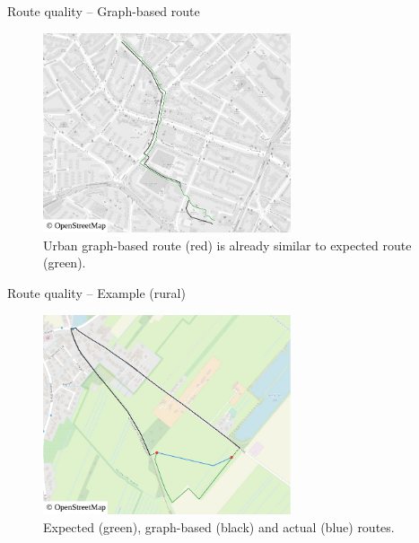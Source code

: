 \documentclass[xcolor={x11names}]{beamer}
\newenvironment{figcenter}
{%
	\parskip=0pt%
	\par%
	\nopagebreak%
	\centering%
}%
{%
	\par%
	\noindent%
	\ignorespacesafterend%
}
\begin{document}
		\begin{frame}{Route quality -- Graph-based route}
			\begin{figure}
				\begin{figcenter}
					\includegraphics[width=0.65\textwidth]{images/qgis-routing-similar.pdf}
				\end{figcenter}
				\caption{Urban graph-based route (red) is already similar to expected route (green).}
			\end{figure}
		\end{frame}
		
		\begin{frame}{Route quality -- Example (rural)}
			\begin{figure}
				\begin{figcenter}
					\includegraphics[width=0.65\textwidth]{images/qgis-routing-rural-routing-6-graph-based.pdf}
				\end{figcenter}
				\caption{Expected (green), graph-based (black) and actual (blue) routes.\newline\ }
			\end{figure}
		\end{frame}
		
\end{document}
